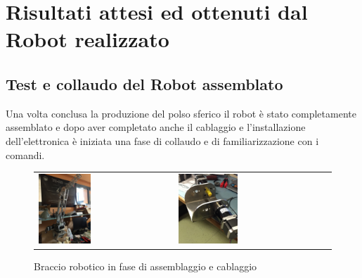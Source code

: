 \documentclass[%
corpo=11pt,
twoside,
 stile=classica,
oldstyle,
greek,%
]{toptesi}
\begin{document}
\cleardoublepage
\chapter{Risultati attesi ed ottenuti dal Robot realizzato}
	\section{Test e collaudo del Robot assemblato}
	Una volta conclusa la produzione del polso sferico il robot è stato completamente assemblato e dopo aver completato anche il cablaggio e l'installazione dell'elettronica è iniziata una fase di collaudo e di familiarizzazione con i comandi. 
	\begin{figure}
		\centering
		\begin{tabular}{ll}
		\includegraphics[width=0.4\textwidth]{image/armfoto.jpg}
		&
		\includegraphics[width=0.4\textwidth]{image/baseass.jpg}
		\end{tabular}
		\caption{Braccio robotico in fase di assemblaggio e cablaggio}
		\label{fig:ass1}
	\end{figure}
\end{document}
